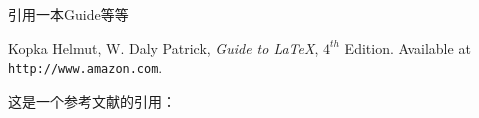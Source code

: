 \documentclass{ctexart}%
\begin{document}
	引用一本Guide\cite{latexGuide}等等
	\begin{thebibliography}{99}
		 Kopka Helmut, W. Daly Patrick,
		\emph{Guide to \LaTeX}, $4^{th}$ Edition.
		Available at \texttt{http://www.amazon.com}.
	\end{thebibliography}
	这是一个参考文献的引用：\cite{scott1988social}
	
\end{document}
